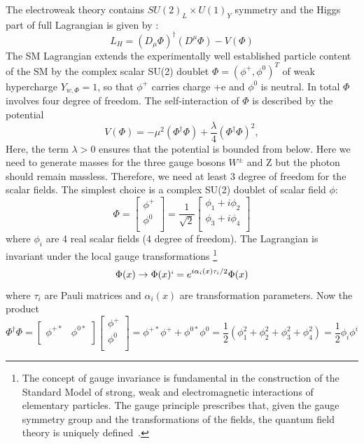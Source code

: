 The electroweak theory contains $SU(2)_L \times U(1)_Y$ symmetry and the Higgs part of full Lagrangian is given by :
\begin{equation}
    L_H=(D_{\mu}\Phi)^{\dagger}(D^{\mu}\Phi)-V(\Phi)
\end{equation}
The SM Lagrangian extends the experimentally well established particle content of the SM by the complex scalar SU(2) doublet $\Phi = (\phi^{+},\phi^0)^T$ of weak hypercharge $Y_{w,\Phi}=1$, so that $\phi^{+}$ carries charge +e and $\phi^0$ is neutral. In total $\Phi$ involves four degree of freedom. The self-interaction of $\Phi$ is described by the potential
\begin{equation}
    V(\Phi)=-\mu^2(\Phi^{\dagger}\Phi)+\frac{\lambda}{4}(\Phi^{\dagger}\Phi)^2,
\end{equation}
Here, the term $\lambda > 0$ ensures that the potential is bounded from below. Here we need to generate masses for the three gauge bosons $W^{\pm}$ and Z but the photon should remain massless. Therefore, we need at least 3 degree of freedom for the scalar fields. The simplest choice is a complex SU(2) doublet of scalar field $\phi$:
\begin{equation}\label{mat2}
    \Phi=
        \begin{bmatrix}
        \phi^+  \\
        \phi^0  \\
        \end{bmatrix}
    =\frac{1}{\sqrt{2}}
        \begin{bmatrix}
        \phi_1 + i\phi_2    \\
        \phi_3 + i\phi_4    \\
        \end{bmatrix}
\end{equation}
where $\phi_i$ are 4 real scalar fields (4 degree of freedom). The Lagrangian is invariant under the local gauge transformations \footnote{The concept of gauge invariance is fundamental in the construction of the Standard Model of strong, weak and electromagnetic interactions of elementary particles. The gauge principle prescribes that, given the gauge symmetry group and the transformations of the fields, the quantum field theory is uniquely defined~\cite{Coughlan2006}.}
\begin{equation}
    \Phi (x) \rightarrow \Phi(x)`=e^{i\alpha_i(x)\tau_i /2}\Phi(x)
\end{equation}
where $\tau_i$ are Pauli matrices and $\alpha_i(x)$ are transformation parameters.
Now the product
\begin{equation}\label{eq:mat1}
    \Phi^{\dagger}\Phi=
        \begin{bmatrix}
        \phi^{+*}   &   \phi^{0*} \\
        \end{bmatrix}
        \begin{bmatrix}
        \phi^+  \\
        \phi^0  \\
        \end{bmatrix}
    =\phi^{+*} \phi^+ + \phi^{0*}\phi^0
    =\frac{1}{2}(\phi^2_1+\phi^2_2+\phi^2_3+\phi^2_4)
    =\frac{1}{2}\phi_i \phi^i
\end{equation}
    
